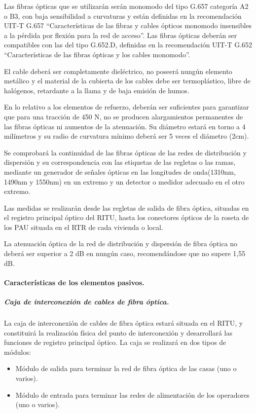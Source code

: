 Las fibras ópticas que se utilizarán serán monomodo del tipo G.657 categoría A2 o B3, con baja sensibilidad a curvaturas y están definidas en la recomendación UIT-T G.657 ``Características de las fibras y cables ópticos monomodo insensibles a la pérdida por flexión para la red de acceso''. Las fibras ópticas deberán ser compatibles con las del tipo G.652.D, definidas en la recomendación UIT-T G.652 ``Características de las fibras ópticas y los cables monomodo''.

El cable deberá ser completamente dieléctrico, no poseerá nungún elemento metálico y el material de la cubierta de los cables debe ser termoplástico, libre de halógenos, retardante a la llama y de baja emisión de humos.

En lo relativo a los elementos de refuerzo, deberán ser suficientes para garantizar que para una tracción de 450 N, no se producen alargamientos permanentes de las fibras ópticas ni aumentos de la atenuación. Su diámetro estará en torno a 4 milímetros y su radio de curvatura mínimo deberá ser 5 veces el diámetro (2cm).

Se comprobará la continuidad de las fibras ópticas de las redes de distribución y dispersión y su correspondencia con las etiquetas de las regletas o las ramas, mediante un generador de señales ópticas en las longitudes de onda(1310nm, 1490nm y 1550nm) en un extremo y un detector o medidor adecuado en el otro extremo.

Las medidas se realizarán desde las regletas de salida de fibra óptica, situadas en el registro principal óptico del RITU, hasta los conectores ópticos de la roseta de los PAU situada en el RTR de cada vivienda o local.

La atenuación óptica de la red de distribución y dispersión de fibra óptica no deberá ser superior a 2 dB en nungún caso, recomendándose que no supere 1,55 dB.
\paragraph{Características de los elementos pasivos.}
\subparagraph{Caja de interconexión de cables de fibra óptica.}
La caja de interconexión de cables de fibra óptica estará situada en el RITU, y constituirá la realización física del punto de interconexión y desarrollará las funciones de registro principal óptico. La caja se realizará en dos tipos de módulos:
\begin{itemize} 
	\item Módulo de salida para terminar la red de fibra óptica de las casas (uno o varios).
	\item Módulo de entrada para terminar las redes de alimentación de los operadores (uno o varios).
\end{itemize}

